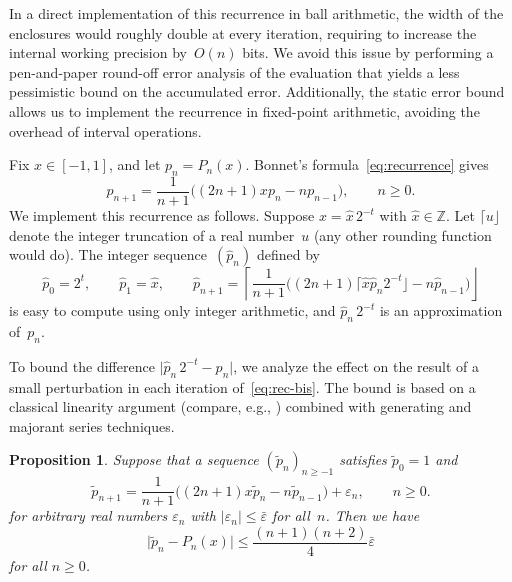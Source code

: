 \documentclass[11pt,a4paper]{article}
\newtheorem{proposition}[theorem]{Proposition}
\newcommand{\abs}[1]{\mathopen| #1 \mathclose|}
\begin{document}
In a direct implementation of this recurrence in ball arithmetic, the
width of the enclosures would roughly double at every iteration,
requiring to increase the internal working precision by $O(n)$ bits.
We avoid this issue by performing a pen-and-paper round-off error
analysis of the evaluation that yields a less pessimistic bound on the
accumulated error.
Additionally, the static error bound allows us to implement the
recurrence in fixed-point arithmetic, avoiding the overhead of
interval operations.

Fix $x \in [-1, 1]$, and let $p_n = P_n(x)$.
Bonnet's formula~\eqref{eq:recurrence} gives
\begin{equation} \label{eq:rec-bis}
  p_{n + 1} =
    \frac{1}{n+1}
    \bigl( (2n +1) x p_n - n p_{n-1} \bigr),
  \qquad n \geq 0.
\end{equation}
We implement this recurrence as follows.
Suppose $x = \hat x \, 2^{-t}$ with $\hat x \in \mathbb Z$.
Let $\lceil u \rfloor$ denote the integer truncation of a real
number~$u$ (any other rounding function would do).
The integer sequence $(\hat p_n)$ defined by
\begin{equation} \label{eq:rec-fxpt}
  \hat{p}_0 = 2^t, \qquad
  \hat{p}_1 = \hat x, \qquad
  \hat{p}_{n + 1} =
    \left\lceil \frac{1}{n + 1}  \bigl( (2 n + 1) \lceil \hat{x}
      \hat{p}_n 2^{- t} \rfloor - n \hat{p}_{n - 1} \bigr)
    \right\rfloor
\end{equation}
is easy to compute using only integer arithmetic, and
$\hat p_n \, 2^{-t}$ is an approximation of $p_n$.

To bound the difference $\abs{\hat p_n \, 2^{-t} - p_n}$, we analyze
the effect on the result of a small perturbation in each iteration
of \eqref{eq:rec-bis}.
The bound is based on a classical linearity argument (compare, e.g.,
\cite{Wimp1984}) combined with generating and majorant series
techniques.

\begin{proposition} \label{prop:rec-error}
Suppose that a sequence $(\tilde p_n)_{n \geq -1}$ satisfies
$\tilde p_0 = 1$ and
\begin{equation} \label{eq:rec-pert}
  \tilde{p}_{n + 1} =
    \frac{1}{n+1}
    \bigl( (2n +1) x \tilde{p}_n - n \tilde{p}_{n-1} \bigr)
    + \varepsilon_n,
  \qquad n \geq 0.
\end{equation}
for arbitrary real numbers $\varepsilon_n$
with $\abs{\varepsilon_n} \leq \bar\varepsilon$ for all $n$.
Then we have
\[
  \abs{\tilde p_n  - P_n(x)}
  \leq \frac{(n+1)(n+2)}{4} \bar \varepsilon
\]
for all $n \geq 0$.
\end{proposition}
\end{document}
